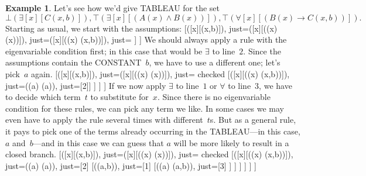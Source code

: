 \documentclass[10pt,a4paper]{article}
\newcommand*{\olup}[1]{\MakeUppercase{#1}}
\theoremstyle{plain}
\theoremstyle{definition}
\newtheorem{ex}[thm]{Example}
\theoremstyle{remark}
\newenvironment{oltableau}{}{}
\providecommand{\lif}{\mathbin{\rightarrow}}
\providecommand{\lforall}{\mathord{\forall}}
\providecommand{\lexists}{\mathord{\exists}}
\providecommand{\sFmla}[2]{#1(#2)}
\providecommand{\formula}{\relax}
\providecommand{\True}{\top}
\providecommand{\False}{\bot}
\providecommand{\TAss}[1]{}
\providecommand{\TRule}[1]{}
\providecommand{\formula}[1]{#1}
\begin{document}
\begin{ex}
Let's see how we'd give \olup{tableau} for the set
\[
\sFmla{\False}{\lexists[x][C(x,b)]},
\sFmla{\True}{\lexists[x][(A(x) \land B(x))]},
\sFmla{\True}{\lforall[x][(B(x) \lif C(x,b))]}.
\]
Starting as usual, we start with the assumptions:
\begin{oltableau}
  [\sFmla{\False}{\lexists[x][\formula{C}(x,b)]}, just=\TAss
    [\sFmla{\True}{\lexists[x][(\formula{A}(x) \land \formula{B}(x))]},
      just=\TAss
      [\sFmla{\True}{\lforall[x][(\formula{B}(x) \lif \formula{C}(x,b))]},
        just=\TAss]
    ]
  ]
\end{oltableau}
We should always apply a rule with the eigenvariable condition first;
in this case that would be $\TRule{\True}{\lexists}$ to
line~$2$. Since the assumptions contain the \olup{constant}~$b$, we have
to use a different one; let's pick~$a$ again.
\begin{oltableau}
  [\sFmla{\False}{\lexists[x][\formula{C}(x,b)]}, just=\TAss
    [\sFmla{\True}{\lexists[x][(\formula{A}(x) \land \formula{B}(x))]},
      just=\TAss, checked
      [\sFmla{\True}{\lforall[x][(\formula{B}(x) \lif \formula{C}(x,b))]},
        just=\TAss
        [\sFmla{\True}{\formula{A}(a) \land \formula{B}(a)},
          just={\TRule{\True}{\lexists}[2]}]
      ]
    ]
  ]
\end{oltableau}
If we now apply $\TRule{\False}{\lexists}$ to line~$1$ or
$\TRule{\True}{\lforall}$ to line~$3$, we have to decide which term~$t$
to substitute for~$x$. Since there is no eigenvariable condition for
these rules, we can pick any term we like. In some cases we may even
have to apply the rule several times with different~$t$s. But as a
general rule, it pays to pick one of the terms already occurring in the
\olup{tableau}---in this case, $a$ and~$b$---and in this case we can
guess that $a$ will be more likely to result in a closed branch.
\begin{oltableau}
  [\sFmla{\False}{\lexists[x][\formula{C}(x,b)]}, just=\TAss
    [\sFmla{\True}{\lexists[x][(\formula{A}(x) \land \formula{B}(x))]},
      just=\TAss, checked
      [\sFmla{\True}{\lforall[x][(\formula{B}(x) \lif \formula{C}(x,b))]}, just=\TAss
        [\sFmla{\True}{\formula{A}(a) \land \formula{B}(a)}, just={\TRule{\True}{\lexists}[2]}
          [\sFmla{\False}{\formula{C}(a,b)}, just={\TRule{\False}{\lexists}[1]}
            [\sFmla{\True}{\formula{B}(a) \lif \formula{C}(a,b)},
              just={\TRule{\True}{\lforall}[3]}
            ]
          ]
        ]
      ]
    ]
  ]
\end{oltableau}

\end{ex}
\end{document}
